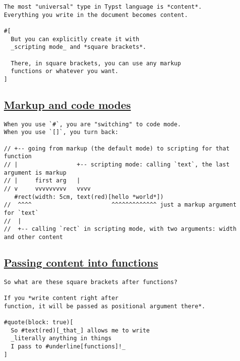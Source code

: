 \begin{verbatim}
The most "universal" type in Typst language is *content*.
Everything you write in the document becomes content.

#[
  But you can explicitly create it with
  _scripting mode_ and *square brackets*.

  There, in square brackets, you can use any markup
  functions or whatever you want.
]
\end{verbatim}

\pandocbounded{}

\subsection{\texorpdfstring{\hyperref[markup-and-code-modes]{Markup and
code modes}}{Markup and code modes}}\label{markup-and-code-modes}

\begin{verbatim}
When you use `#`, you are "switching" to code mode.
When you use `[]`, you turn back:

// +-- going from markup (the default mode) to scripting for that function
// |                 +-- scripting mode: calling `text`, the last argument is markup
// |     first arg   |
// v     vvvvvvvvv   vvvv
   #rect(width: 5cm, text(red)[hello *world*])
//  ^^^^                       ^^^^^^^^^^^^^ just a markup argument for `text`
//  |
//  +-- calling `rect` in scripting mode, with two arguments: width and other content
\end{verbatim}

\pandocbounded{}

\subsection{\texorpdfstring{\hyperref[passing-content-into-functions]{Passing
content into
functions}}{Passing content into functions}}\label{passing-content-into-functions}

\begin{verbatim}
So what are these square brackets after functions?

If you *write content right after
function, it will be passed as positional argument there*.

#quote(block: true)[
  So #text(red)[_that_] allows me to write
  _literally anything in things
  I pass to #underline[functions]!_
]
\end{verbatim}

